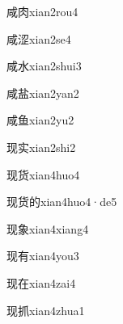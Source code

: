 \begin{verbete}[9;6]{咸肉}{xian2rou4}
\end{verbete}

\begin{verbete}[9;10]{咸涩}{xian2se4}
\end{verbete}

\begin{verbete}[9;4]{咸水}{xian2shui3}
\end{verbete}

\begin{verbete}[9;10]{咸盐}{xian2yan2}
\end{verbete}

\begin{verbete}[9;8]{咸鱼}{xian2yu2}
\end{verbete}

\begin{verbete}[9;8]{现实}{xian2shi2}
\end{verbete}

\begin{verbete}[8;8]{现货}{xian4huo4}
\end{verbete}

\begin{verbete}[8;8;8]{现货的}{xian4huo4·de5}
\end{verbete}

\begin{verbete}[8;11]{现象}{xian4xiang4}
\end{verbete}

\begin{verbete}[8;6]{现有}{xian4you3}
\end{verbete}

\begin{verbete}[8;6]{现在}{xian4zai4}
\end{verbete}

\begin{verbete}[8;7]{现抓}{xian4zhua1}
\end{verbete}

